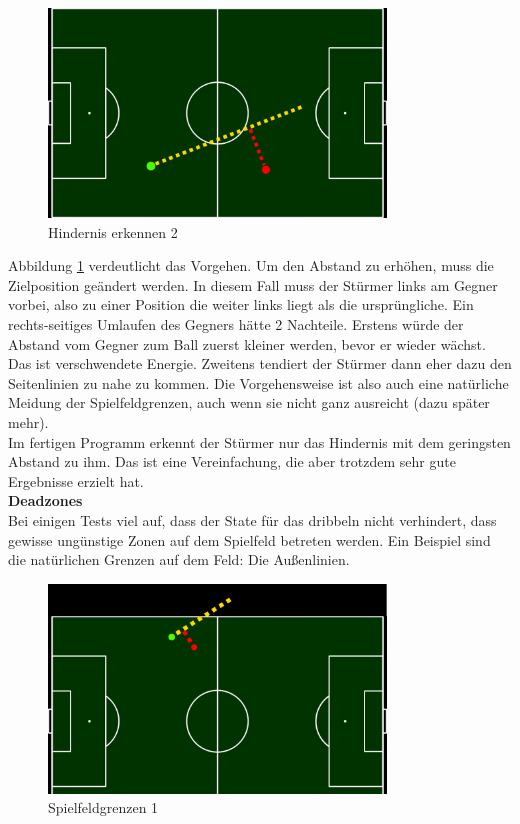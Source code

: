 \documentclass[fontsize=12pt,a4paper,final]{scrartcl}[2003/01/01]
\begin{document}
\begin{figure}[H]
	\centering
	\includegraphics[width=0.8\textwidth]{Grafiken/KI/obstacle_3}
	\caption{Hindernis erkennen 2}
	\label{Hindernis erkennen 2}
\end{figure}

Abbildung \ref{Hindernis erkennen 2} verdeutlicht das Vorgehen. Um den Abstand zu erhöhen, muss die Zielposition geändert werden. In diesem Fall muss der Stürmer links am Gegner vorbei, also zu einer Position die weiter links liegt als die ursprüngliche. Ein rechts-seitiges Umlaufen des Gegners hätte 2 Nachteile. Erstens würde der Abstand vom Gegner zum Ball zuerst kleiner werden, bevor er wieder wächst. Das ist verschwendete Energie. Zweitens tendiert der Stürmer dann eher dazu den Seitenlinien zu nahe zu kommen. Die Vorgehensweise ist also auch eine natürliche Meidung der Spielfeldgrenzen, auch wenn sie nicht ganz ausreicht (dazu später mehr).
\\

Im fertigen Programm erkennt der Stürmer nur das Hindernis mit dem geringsten Abstand zu ihm. Das ist eine Vereinfachung, die aber trotzdem sehr gute Ergebnisse erzielt hat.
\\

\textbf{Deadzones}
\\

Bei einigen Tests viel auf, dass der State für das dribbeln nicht verhindert, dass gewisse ungünstige Zonen auf dem Spielfeld betreten werden. Ein Beispiel sind die natürlichen Grenzen auf dem Feld: Die Außenlinien.

\begin{figure}[H]
	\centering
	\includegraphics[width=0.8\textwidth]{Grafiken/KI/deadzone_1}
	\caption{Spielfeldgrenzen 1}
	\label{Spielfeldgrenzen 1}
\end{figure}
\end{document}
